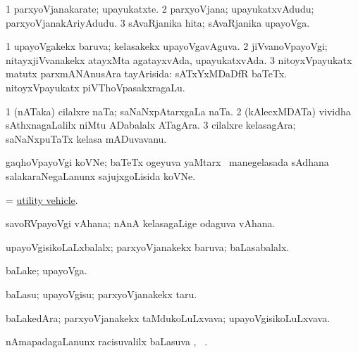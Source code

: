 \bentry
{} 
\gl{\nA}
\bmng
\bnum
\num{1} parxyoVjanakarate; upayukatxte. 
\num{2} parxyoVjana; upayukatxvAdudu; parxyoVjanakAriyAdudu. 
\num{3} sAvaRjanika hita; sAvaRjanika upayoVga. 
\enum
\emng
\eentry

\bentry
{} 
\gl{\gu}
\expl{}
\bmng
\bnum
\num{1} upayoVgakekx baruva; kelasakekx upayoVgavAguva. 
\num{2} jiVvanoVpayoVgi; nitayxjiVvanakekx atayxMta agatayxvAda, upayukatxvAda.
\num{3} nitoyxVpayukatx matutx parxmANAnusAra tayArisida:  sATxYxMDaDfR baTeTx.  nitoyxVpayukatx piVThoVpasakxragaLu. 
\enum
\emng
\eentry

\bentry
{}
\gl{\nA}
\expl{}
\bmng
\bnum
\num{1} (nATaka) cilalxre naTa; saNaNxpAtarxgaLa naTa. 
\num{2} (kAlecxMDATa) vividha sAthxnagaLalilx niMtu ADabalalx ATagAra. 
\num{3} cilalxre kelasagAra; saNaNxpuTaTx kelasa mADuvavanu. 
\enum
\emng
\eentry

\bentry
{}
\gl{\nA}
\expl{}
\bmng
gaqhoVpayoVgi koVNe; baTeTx ogeyuva yaMtarx \mo\ manegelasada sAdhana salakaraNegaLanunx sajujxgoLisida koVNe. 
\emng
\eentry

\bentry
{}
\gl{\nA}
\expl{}
\bmng
= \hyperlink{utility vehicle}{utility vehicle}. 
\emng
\eentry

\bentry
{}
\gl{\nA}
\expl{}
\bmng
savoRVpayoVgi vAhana; nAnA kelasagaLige odaguva vAhana. 
\emng
\eentry

\bentry
{} 
\gl{\gu}
\expl{}
\bmng
upayoVgisikoLaLxbalalx; parxyoVjanakekx baruva; baLasabalalx. 
\emng
\eentry

\bentry
{} 
\gl{\nA}
\expl{}
\bmng
baLake; upayoVga. 
\emng
\eentry

\bentry
{} 
\gl{\sakirx}
\expl{}
\bmng
baLasu; upayoVgisu; parxyoVjanakekx taru. 
\emng
\eentry

\bentry
{} 
\gl{\nA}
\expl{}
\bmng
baLakedAra; parxyoVjanakekx taMdukoLuLxvava; upayoVgisikoLuLxvava. 
\emng
\eentry

\bentry
{} 
\gl{\uparx}
\expl{}
\bmng
nAmapadagaLanunx racisuvalilx baLasuva \uparx, \udA\ . 
\emng
\eentry

